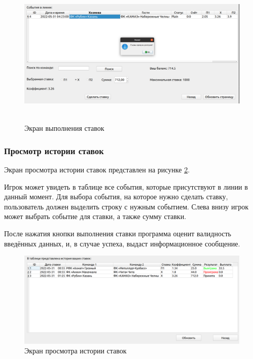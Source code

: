 \FloatBarrier
\begin{figure}[h]	
	\begin{center}
		\includegraphics[height = 7cm, width=\linewidth]{inc/bet.png}
	\end{center}
	\captionsetup{justification=centering, labelsep=defffis}
	\caption{Экран выполнения ставок}
	\label{fig::bet}
\end{figure}
\FloatBarrier

\subsubsection{Просмотр истории ставок}
Экран просмотра истории ставок представлен на рисунке \ref{fig::history}.

Игрок может увидеть в таблице все события, которые присутствуют в линии в данный момент.
Для выбора события, на которое нужно сделать ставку, пользователь должен выделить строку с нужным событием.
Слева внизу игрок может выбрать событие для ставки, а также сумму ставки.

После нажатия кнопки выполнения ставки программа оценит валидность введённых данных, и, в случае успеха, выдаст информационное сообщение.

\FloatBarrier
\begin{figure}[h]	
	\begin{center}
		\includegraphics[width=\linewidth]{inc/history.png}
	\end{center}
	\captionsetup{justification=centering, labelsep=defffis}
	\caption{Экран просмотра истории ставок}
	\label{fig::history}
\end{figure}
\FloatBarrier

